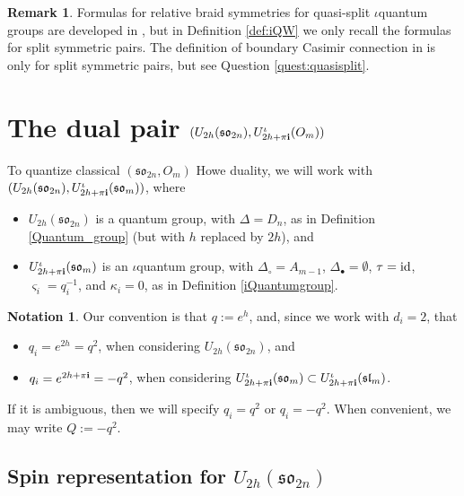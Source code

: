 \documentclass[10pt]{amsart}
\numberwithin{equation}{section}
\theoremstyle{definition}
\newtheorem{remark}[theorem]{Remark}
\newtheorem{notation}[theorem]{Notation}
\newcommand{\id}{{\rm id}}
\newcommand{\slm}{\mathfrak{sl}_{m}}
\newcommand{\son}[1][2n]{\mathfrak{so}_{#1}}
\newcommand{\som}[1][m]{\mathfrak{so}_{#1}}
\begin{document}
    \begin{remark}
        Formulas for relative braid symmetries for quasi-split $\iota$quantum groups are developed in \cite{WW25}, but in Definition \ref{def:iQW} we only recall the formulas for split symmetric pairs. The definition of boundary Casimir connection in \cite{MR4983792} is only for split symmetric pairs, but see Question \ref{quest:quasisplit}.
    \end{remark}


\section{The dual pair $(U_{2h}(\son), U_{2h+\pi {\bf i}}^{\iota}(O_m))$}\label{sec5}




    To quantize classical $(\son, 
    O_m)$ Howe duality, we will work with $(U_{2h}(\son[2n]), U^{\iota}_{2h+\pi {\bf i}}(\mathfrak{so}_m))$, where
        \begin{itemize}
            \item $U_{2h}(\son[2n])$ is a quantum group, with $\Delta=D_n$, as in Definition \ref{Quantum_group} (but with $h$ replaced by $2h$), and
            \item $U^{\iota}_{2h+\pi {\bf i}}(\mathfrak{so}_m)$ is an $\iota$quantum group, with $\Delta_{\circ}=A_{m-1}$, $\Delta_{\bullet} = \emptyset$, $\tau=\id$, $\varsigma_i=q_i^{-1}$, and $\kappa_i=0$, as in Definition \ref{iQuantumgroup}.
        \end{itemize}

\begin{notation}
    Our convention is that $q:=e^h$, and, since we work with $d_i=2$, that 
    \begin{itemize}
        \item $q_i=e^{2h}=q^2$, when considering $U_{2h}(\son)$, and
        \item $q_i=e^{2h+\pi {\bf i}} = -q^2$, when considering $U_{2h+\pi {\bf i}}^{\iota}(\som)\subset U_{2h+\pi {\bf i}}^{\iota}(\slm)$. 
    \end{itemize}
    If it is ambiguous, then we will specify $q_i=q^2$ or $q_i=-q^2$. When convenient, we may write $Q:=-q^2$.
\end{notation}

\subsection{Spin representation for $U_{2h}(\son[2n])$}
\end{document}

